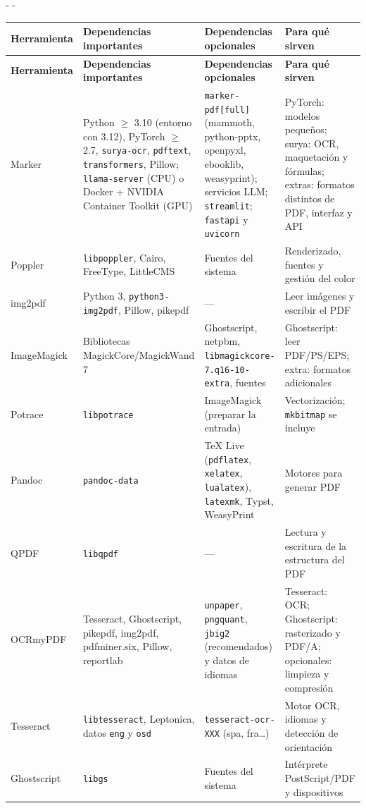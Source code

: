\documentclass[11pt,a4paper]{article}
\makeatletter
\newcommand{\necesitaespacio}[1]{\par\penalty-100\begingroup
	\setlength{\dimen@}{#1}\dimen@ii\pagegoal\advance\dimen@ii-\pagetotal
	\ifdim\dimen@>\dimen@ii\ifdim\dimen@ii>\z@\vfil\fi\penalty-\@M\fi\endgroup}
\newcommand{\cmd}[1]{\texttt{\textcolor{colcmd}{#1}}}      %
\newcommand{\cab}[1]{\textbf{#1}}
\makeatother
\begin{document}
	\begingroup\small
	\necesitaespacio{10\baselineskip}
	\begin{longtable}{L{2.2cm}L{3.96cm}L{4.3cm}L{4.0cm}}
		\toprule{}\cab{Herramienta} & \cab{Dependencias importantes} & \cab{Dependencias opcionales} & \cab{Para qué sirven}\\\midrule
		\endfirsthead
		\toprule{}\cab{Herramienta} & \cab{Dependencias importantes} & \cab{Dependencias opcionales} & \cab{Para qué sirven}\\\midrule
		\endhead
		\bottomrule
		\endfoot
		Marker & Python $\geq$ 3.10 (entorno con 3.12), PyTorch $\geq$ 2.7, \texttt{surya-ocr}, \texttt{pdftext}, \texttt{transformers}, Pillow; \cmd{llama-server} (CPU) o Docker + NVIDIA Container Toolkit (GPU) & \texttt{marker-\allowbreak{}pdf[full]} (mammoth, python-pptx, openpyxl, ebooklib, weasyprint); servicios LLM; \texttt{streamlit}; \texttt{fastapi} y \texttt{uvicorn} & PyTorch: modelos pequeños; surya: OCR, maquetación y fórmulas; extras: formatos distintos de PDF, interfaz y API\\*
		Poppler & \texttt{libpoppler}, Cairo, FreeType, LittleCMS & Fuentes del sistema & Renderizado, fuentes y gestión del color\\
		img2pdf & Python 3, \texttt{python3-\allowbreak{}img2pdf}, Pillow, pikepdf & --- & Leer imágenes y escribir el PDF\\
		ImageMagick & Bibliotecas MagickCore/MagickWand 7 & Ghostscript, netpbm, \texttt{libmagickcore-\allowbreak{}7.q16-\allowbreak{}10-\allowbreak{}extra}, fuentes & Ghostscript: leer PDF/PS/EPS; extra: formatos adicionales\\
		Potrace & \texttt{libpotrace} & ImageMagick (preparar la entrada) & Vectorización; \cmd{mkbitmap} se incluye\\
		Pandoc & \texttt{pandoc-data} & TeX Live (\cmd{pdflatex}, \cmd{xelatex}, \cmd{lualatex}), \cmd{latexmk}, Typst, WeasyPrint & Motores para generar PDF\\
		QPDF & \texttt{libqpdf} & --- & Lectura y escritura de la estructura del PDF\\
		OCRmyPDF & Tesseract, Ghostscript, pikepdf, img2pdf, pdfminer.six, Pillow, reportlab & \texttt{unpaper}, \texttt{pngquant}, \texttt{jbig2} (recomendados) y datos de idiomas & Tesseract: OCR; Ghostscript: rasterizado y PDF/A; opcionales: limpieza y compresión\\
		Tesseract & \texttt{libtesseract}, Leptonica, datos \texttt{eng} y \texttt{osd} & \texttt{tesseract-\allowbreak{}ocr-\allowbreak{}XXX} (spa, fra\ldots) & Motor OCR, idiomas y detección de orientación\\*
		Ghostscript & \texttt{libgs} & Fuentes del sistema & Intérprete PostScript/PDF y dispositivos\\
	\end{longtable}
	\endgroup
	
\end{document}
